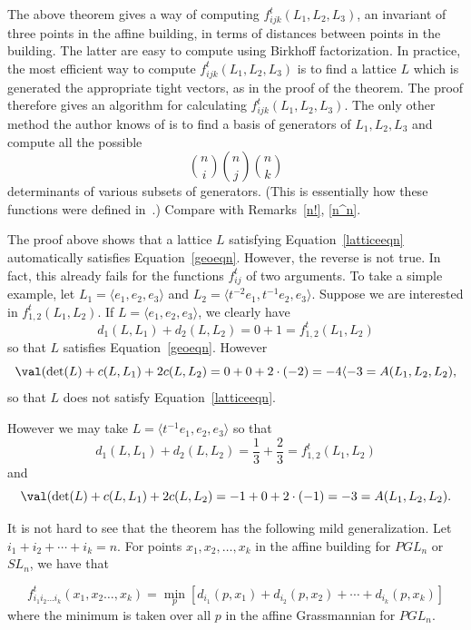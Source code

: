 \begin{rema} The above theorem gives a way of computing $f_{ijk}^t (L_1,L_2,L_3)$, an invariant of three points in the affine building, in terms of distances between points in the building. The latter are easy to compute using Birkhoff factorization. In practice, the most efficient way to compute $f_{ijk}^t (L_1,L_2,L_3)$ is to find a lattice $L$ which is generated the appropriate tight vectors, as in the proof of the theorem. The proof therefore gives an algorithm for calculating $f_{ijk}^t (L_1,L_2,L_3)$. The only other method the author knows of is to find a basis of generators of $L_1, L_2, L_3$ and compute all the possible
\[
 \binom{n}{i} \binom{n}{j} \binom{n}{k}
\] 
determinants of various subsets of generators. (This is essentially how these functions were defined in~\cite{K}.) Compare with Remarks~\ref{n!}, \ref{n^n}.
\end{rema}

\begin{example} The proof above shows that a lattice $L$ satisfying Equation~\eqref{latticeeqn} automatically satisfies Equation~\eqref{geoeqn}. However, the reverse is not true. In fact, this already fails for the functions $f^t_{ij}$ of two arguments. To take a simple example, let $L_1=\langle e_1, e_2, e_3\rangle $ and $L_2=\langle t^{-2}e_1, t^{-1}e_2, e_3\rangle $. Suppose we are interested in $f^t_{1,2}(L_1,L_2)$. If $L=\langle e_1, e_2, e_3\rangle $, we clearly have 
\[
d_1(L,L_1) + d_2(L,L_2) = 0 + 1 = f^t_{1,2}(L_1,L_2)
\]
so that $L$ satisfies Equation~\eqref{geoeqn}. However
\[
\val(\det(L) + c(L,L_1) + 2c(L,L_2) = 0 + 0 + 2\cdot(-2) = -4 \langle -3 = A(L_1,L_2,L_2),
\]
so that $L$ does not satisfy Equation~\eqref{latticeeqn}.

However we may take $L=\langle t^{-1}e_1, e_2, e_3\rangle $ so that
\[
d_1(L,L_1) + d_2(L,L_2) = \frac{1}{3} + \frac{2}{3} = f^t_{1,2}(L_1,L_2)
\]
and 
\[
\val(\det(L) + c(L,L_1) + 2c(L,L_2) = -1 + 0 + 2\cdot(-1) = -3 = A(L_1,L_2,L_2).
\]
\end{example}


It is not hard to see that the theorem has the following mild generalization. Let $i_1+i_2+\cdots+i_k=n$. For points $x_1, x_2, \dots, x_k$ in the affine building for $PGL_n$ or $SL_n$, we have that
\begin{theorem}\label{basicfn}
\[
f_{i_1i_2\dots i_k}^t(x_1,x_2\dots,x_k)= \min_{p} [ d_{i_1}(p,x_1) + d_{i_2}(p,x_2) + \cdots + d_{i_k}(p,x_k) ]
\]
where the minimum is taken over all $p$ in the affine Grassmannian for $PGL_n$.
\end{theorem}

